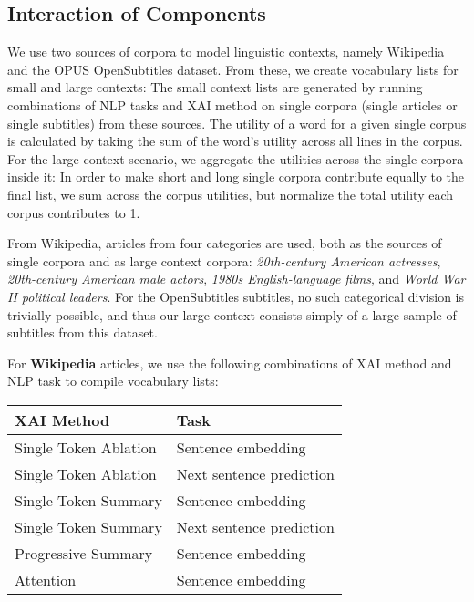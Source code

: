 \subsection{Interaction of Components} \label{sec:impl-summary-description}
We use two sources of corpora to model linguistic contexts, namely Wikipedia and the OPUS OpenSubtitles dataset.
From these, we create vocabulary lists for small and large contexts:
The small context lists are generated by running combinations of NLP tasks and XAI method on single corpora (single articles or single subtitles) from these sources.
The utility of a word for a given single corpus is calculated by taking the sum of the word's utility across all lines in the corpus.
For the large context scenario, we aggregate the utilities across the single corpora inside it:
In order to make short and long single corpora contribute equally to the final list, we sum across the corpus utilities, but normalize the total utility each corpus contributes to 1.

From Wikipedia, articles from four categories are used, both as the sources of single corpora and as large context corpora:
\textit{20th-century American actresses},
\textit{20th-century American male actors},
\textit{1980s English-language films}, and
\textit{World War II political leaders}.
For the OpenSubtitles subtitles, no such categorical division is trivially possible, and thus our large context consists simply of a large sample of subtitles from this dataset.

For \textbf{Wikipedia} articles, we use the following combinations of XAI method and NLP task to compile vocabulary lists:

\begin{table}[H]
	\centering
	\begin{tabularx}{\textwidth}{|X|X|}
		\hline
		\textbf{XAI Method}   & \textbf{Task}            \\
		\hline
		Single Token Ablation & Sentence embedding       \\
		\hline
		Single Token Ablation & Next sentence prediction \\
		\hline
		Single Token Summary  & Sentence embedding       \\
		\hline
		Single Token Summary  & Next sentence prediction \\
		\hline
		Progressive Summary   & Sentence embedding       \\
		\hline
		Attention             & Sentence embedding       \\
		\hline
	\end{tabularx}
\end{table}

